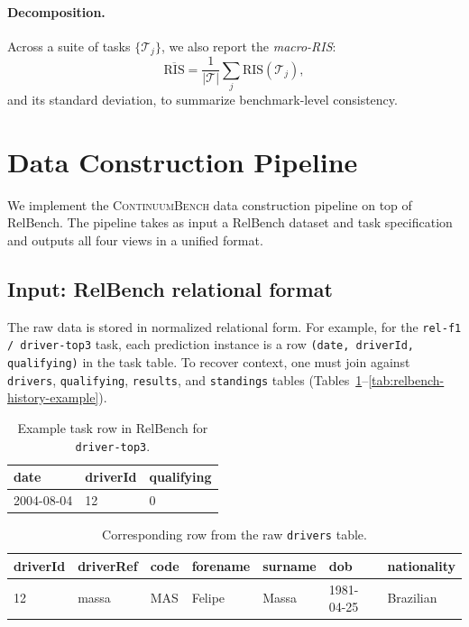 \documentclass[11pt]{article}
\newcommand{\cb}{\textsc{ContinuumBench}}
\newcommand{\RIS}{\mathrm{RIS}}
\begin{document}
\paragraph{Decomposition.}
Across a suite of tasks $\{\mathcal{T}_j\}$, we also report the
\emph{macro-RIS}:
\[
  \overline{\RIS} = \frac{1}{|\mathcal{T}|}\sum_j \RIS(\mathcal{T}_j),
\]
and its standard deviation, to summarize benchmark-level consistency.

\section{Data Construction Pipeline}
\label{sec:pipeline}

We implement the \cb{} data construction pipeline on top of RelBench.
The pipeline takes as input a RelBench dataset and task specification
and outputs all four views in a unified format.

\subsection{Input: RelBench relational format}

The raw data is stored in normalized relational form.
For example, for the \texttt{rel-f1 / driver-top3} task, each
prediction instance is a row \texttt{(date, driverId, qualifying)}
in the task table.
To recover context, one must join against \texttt{drivers},
\texttt{qualifying}, \texttt{results}, and \texttt{standings}
tables (Tables~\ref{tab:relbench-task-example}--\ref{tab:relbench-history-example}).

\begin{table}[h]
\centering
\small
\caption{Example task row in RelBench for \texttt{driver-top3}.}
\label{tab:relbench-task-example}
\begin{tabular}{lll}
\toprule
date & driverId & qualifying \\
\midrule
2004-08-04 & 12 & 0 \\
\bottomrule
\end{tabular}
\end{table}

\begin{table}[h]
\centering
\small
\caption{Corresponding row from the raw \texttt{drivers} table.}
\label{tab:relbench-drivers-example}
\begin{tabular}{lllllll}
\toprule
driverId & driverRef & code & forename & surname & dob & nationality \\
\midrule
12 & massa & MAS & Felipe & Massa & 1981-04-25 & Brazilian \\
\bottomrule
\end{tabular}
\end{table}
\end{document}
